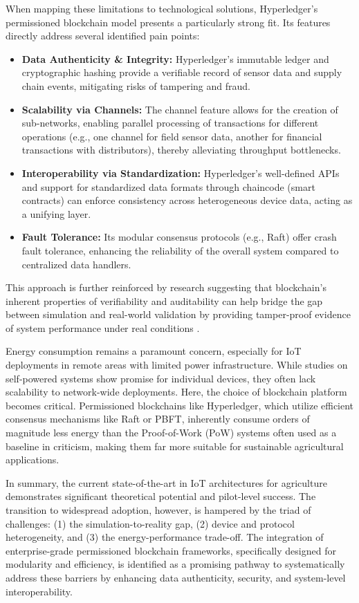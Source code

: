 \documentclass[12pt,onecolumn]{IEEEtran} %
\begin{document}
When mapping these limitations to technological solutions, Hyperledger's permissioned blockchain model presents a particularly strong fit. Its features directly address several identified pain points:
\begin{itemize}
    \item \textbf{Data Authenticity \& Integrity:} Hyperledger's immutable ledger and cryptographic hashing provide a verifiable record of sensor data and supply chain events, mitigating risks of tampering and fraud.
    \item \textbf{Scalability via Channels:} The channel feature allows for the creation of sub-networks, enabling parallel processing of transactions for different operations (e.g., one channel for field sensor data, another for financial transactions with distributors), thereby alleviating throughput bottlenecks.
    \item \textbf{Interoperability via Standardization:} Hyperledger's well-defined APIs and support for standardized data formats through chaincode (smart contracts) can enforce consistency across heterogeneous device data, acting as a unifying layer.
    \item \textbf{Fault Tolerance:} Its modular consensus protocols (e.g., Raft) offer crash fault tolerance, enhancing the reliability of the overall system compared to centralized data handlers.
\end{itemize}

This approach is further reinforced by research suggesting that blockchain's inherent properties of verifiability and auditability can help bridge the gap between simulation and real-world validation by providing tamper-proof evidence of system performance under real conditions \cite{abunadi2022trafficawaresecuredcooperative, ouafiq2022datamanagementand}.

Energy consumption remains a paramount concern, especially for IoT deployments in remote areas with limited power infrastructure. While studies on self-powered systems \cite{raju2022aselfpoweredrealtime} show promise for individual devices, they often lack scalability to network-wide deployments. Here, the choice of blockchain platform becomes critical. Permissioned blockchains like Hyperledger, which utilize efficient consensus mechanisms like Raft or PBFT, inherently consume orders of magnitude less energy than the Proof-of-Work (PoW) systems often used as a baseline in criticism, making them far more suitable for sustainable agricultural applications.

In summary, the current state-of-the-art in IoT architectures for agriculture demonstrates significant theoretical potential and pilot-level success. The transition to widespread adoption, however, is hampered by the triad of challenges: (1) the simulation-to-reality gap, (2) device and protocol heterogeneity, and (3) the energy-performance trade-off. The integration of enterprise-grade permissioned blockchain frameworks, specifically designed for modularity and efficiency, is identified as a promising pathway to systematically address these barriers by enhancing data authenticity, security, and system-level interoperability.
\end{document}
